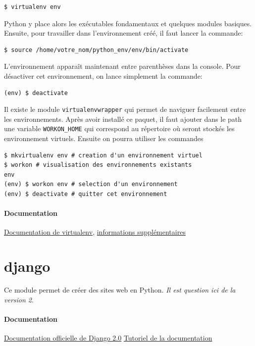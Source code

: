 \documentclass[a4paper, 10pt]{article}
\begin{document}
\begin{verbatim}
$ virtualenv env
\end{verbatim}

Python y place alors les exécutables fondamentaux et quelques modules basiques. Ensuite, pour travailler dans l'environnement créé, il faut lancer la commande:
\begin{verbatim}
$ source /home/votre_nom/python_env/env/bin/activate
\end{verbatim}

L'environnement apparaît maintenant entre parenthèses dans la console. Pour désactiver cet environnement, on lance simplement la commande:

\begin{verbatim}
(env) $ deactivate
\end{verbatim}

Il existe le module \texttt{virtualenvwrapper} qui permet de naviguer facilement entre les environnements. Après avoir installé ce paquet, il faut ajouter dans le path une variable \texttt{WORKON_HOME} qui correspond au répertoire où seront stockés les environnement virtuels. Ensuite on pourra utiliser les commandes

\begin{verbatim}
$ mkvirtualenv env # creation d'un environnement virtuel
$ workon # visualisation des environnements existants
env
(env) $ workon env # selection d'un environnement
(env) $ deactivate # quitter cet environnement
\end{verbatim}

\paragraph{Documentation} \href{https://virtualenv.pypa.io/en/stable/}{Documentation de virtualenv}, \href{http://sametmax.com/les-environnement-virtuels-python-virtualenv-et-virtualenvwrapper/}{informations supplémentaires}


\section{django}
Ce  module permet de créer des sites web en Python. \emph{Il est question ici de la version 2}.
\paragraph{Documentation} \href{https://docs.djangoproject.com/fr/2.0/}{Documentation officielle de Django 2.0} \href{https://docs.djangoproject.com/fr/2.0/intro/}{Tutoriel de la documentation}
\end{document}
